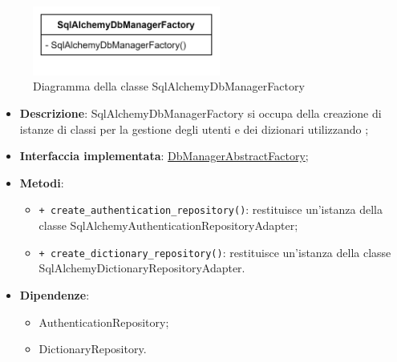  \label{SqlAlchemyDbManagerFactory}
\begin{figure}[H]
    \centering
    \includegraphics[width=0.55\textwidth]{assets/Backend/sql_alchemy_db_manager_factory.png}
    \caption{Diagramma della classe SqlAlchemyDbManagerFactory}
  \end{figure}
\begin{itemize}
    \item \textbf{Descrizione}: SqlAlchemyDbManagerFactory si occupa della creazione di istanze di classi per la gestione degli utenti e dei dizionari utilizzando ;
    \item \textbf{Interfaccia implementata}: \hyperref[DbManagerAbstractFactory]{DbManagerAbstractFactory};
    \item \textbf{Metodi}:
    \begin{itemize}
        \item \texttt{+ create\_authentication\_repository()}: restituisce un'istanza della classe SqlAlchemyAuthenticationRepositoryAdapter;
        \item \texttt{+ create\_dictionary\_repository()}: restituisce un'istanza della classe SqlAlchemyDictionaryRepositoryAdapter.
    \end{itemize}
    \item \textbf{Dipendenze}:
    \begin{itemize}
        \item AuthenticationRepository;
        \item DictionaryRepository.
    \end{itemize}
\end{itemize}

